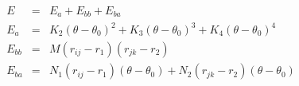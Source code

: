\documentclass[12pt]{article}
\begin{document}
\begin{eqnarray*}
  E & = & E_a + E_{bb} + E_{ba} \\
  E_a & = & K_2 (\theta - \theta_0)^2 + K_3 (\theta - \theta_0)^3 + K_4 (\theta - \theta_0)^4 \\
  E_{bb} & = & M (r_{ij} - r_1) (r_{jk} - r_2) \\
  E_{ba} & = & N_1 (r_{ij} - r_1) (\theta - \theta_0) + N_2 (r_{jk} - r_2) (\theta - \theta_0)
\end{eqnarray*}
\end{document}
